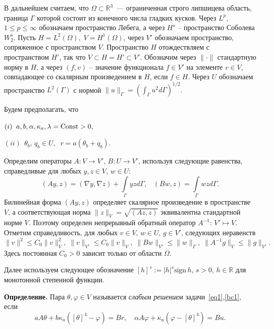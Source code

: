 \documentclass[12pt]{article}
\begin{document}
    В дальнейшем считаем, что $\Omega\subset \mathbb{R}^3$~--- ограниченная строго липшицева
    область, граница $\Gamma$ которой состоит из конечного числа
    гладких кусков.
    Через $L^p$, $1 \leq p \leq \infty$ обозначаем
    пространство Лебега, а через $H^s$ -- пространство Соболева $W^s_2$.
    Пусть $H = L^2(\Omega), \; V = H^1(\Omega)$, через $V'$ обозначаем
    пространство, сопряженное с пространством $V$.
    Пространство $H$ отождествляем с пространством $H'$, так что $V \subset H = H' \subset V'$.
    Обозначим через $\|\cdot\|$ стандартную норму в $H$, а через
    $(f,v)$ -- значение функционала $f\in V'$ на элементе $v\in V$,
    совпадающее со скалярным произведением в $H$, если $f\in H$.
    Через $U$ обозначаем пространство $L^2(\Gamma)$ с нормой
    $\|u\|_\Gamma=\left(\int_\Gamma u^2d\Gamma\right)^{1/2}.$



    Будем предполагать, что

    $(i) \;\; a,b,\alpha,\kappa_a, \lambda ={\rm Const}> 0 ,$

    $(ii) \;\, \theta_b, \,q_b \in U,\;\; r=a(\theta_b+q_b).$


    Определим операторы $A\colon V \to V'$, $B\colon U \to V'$, используя
    следующие равенства, справедливые для любых $y,z \in V$, $w\in U$:
    \[
        (Ay,z) = (\nabla y, \nabla z) +
        \int\limits_{\Gamma}yz d\Gamma, \;\;\; (Bw, z)
        = \int\limits_{\Gamma}wz d\Gamma.
    \]
    Билинейная форма $(Ay,z)$ определяет скалярное произведение
    в пространстве $V$, а соответствующая норма $\|z\|_V=\sqrt{(Az,z)}$ эквивалентна
    стандартной норме $V$.
    Поэтому определен непрерывный обратный оператор
    $A^{-1}:\,V'\mapsto V.$ Отметим справедливость, для любых
    $v\in V$, $w\in U$, $g\in V'$, следующих неравенств
    \begin{equation}
        \label{E}
        \|v\|^2\leq C_0\|v\|^2_V,\; \|v\|_{V'}\leq C_0\|v\|_V,\; \|Bw\|_{V'}\leq \|w\|_\Gamma,\;
        \|A^{-1}g\|_{V}\leq \|g\|_{V'}.
    \end{equation}
    Здесь постоянная $C_0>0$ зависит только от области $\Omega.$




    Далее используем следующее обозначение
    $[h]^s := |h|^s \mathrm{sign}\, h$,
    $s > 0$, $h \in \mathbb R$ для монотонной степенной функции.


    {\bf Определение.} Пара $\theta, \varphi\in V$
    называется {\it слабым решением} задачи~\eqref{eq1},\eqref{bc1}, если
    \begin{equation}
        \label{w1}
        a A \theta + b \kappa_a ([\theta]^4 - \varphi ) = Br,\quad
        \alpha A \varphi + \kappa_a (\varphi - [\theta]^4)  = Bu.
    \end{equation}
\end{document}
